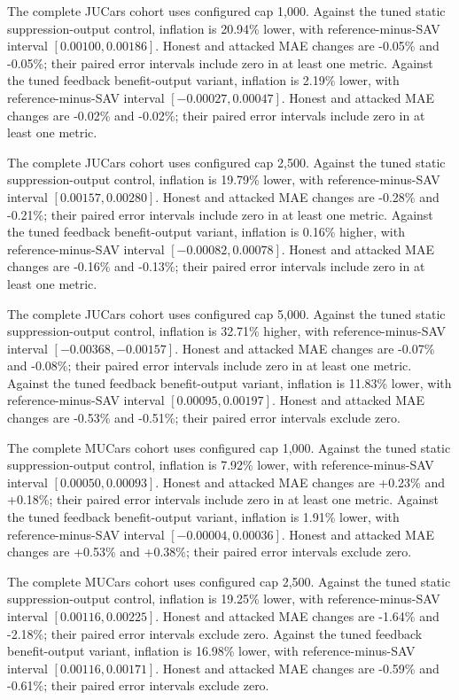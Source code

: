 \documentclass[10pt,journal]{IEEEtran}
\begin{document}
The complete JUCars cohort uses configured cap 1,000. Against the tuned static suppression-output control, inflation is 20.94\% lower, with reference-minus-SAV interval $[0.00100,0.00186]$. Honest and attacked MAE changes are -0.05\% and -0.05\%; their paired error intervals include zero in at least one metric. Against the tuned feedback benefit-output variant, inflation is 2.19\% lower, with reference-minus-SAV interval $[-0.00027,0.00047]$. Honest and attacked MAE changes are -0.02\% and -0.02\%; their paired error intervals include zero in at least one metric.

The complete JUCars cohort uses configured cap 2,500. Against the tuned static suppression-output control, inflation is 19.79\% lower, with reference-minus-SAV interval $[0.00157,0.00280]$. Honest and attacked MAE changes are -0.28\% and -0.21\%; their paired error intervals include zero in at least one metric. Against the tuned feedback benefit-output variant, inflation is 0.16\% higher, with reference-minus-SAV interval $[-0.00082,0.00078]$. Honest and attacked MAE changes are -0.16\% and -0.13\%; their paired error intervals include zero in at least one metric.

The complete JUCars cohort uses configured cap 5,000. Against the tuned static suppression-output control, inflation is 32.71\% higher, with reference-minus-SAV interval $[-0.00368,-0.00157]$. Honest and attacked MAE changes are -0.07\% and -0.08\%; their paired error intervals include zero in at least one metric. Against the tuned feedback benefit-output variant, inflation is 11.83\% lower, with reference-minus-SAV interval $[0.00095,0.00197]$. Honest and attacked MAE changes are -0.53\% and -0.51\%; their paired error intervals exclude zero.

The complete MUCars cohort uses configured cap 1,000. Against the tuned static suppression-output control, inflation is 7.92\% lower, with reference-minus-SAV interval $[0.00050,0.00093]$. Honest and attacked MAE changes are +0.23\% and +0.18\%; their paired error intervals include zero in at least one metric. Against the tuned feedback benefit-output variant, inflation is 1.91\% lower, with reference-minus-SAV interval $[-0.00004,0.00036]$. Honest and attacked MAE changes are +0.53\% and +0.38\%; their paired error intervals exclude zero.

The complete MUCars cohort uses configured cap 2,500. Against the tuned static suppression-output control, inflation is 19.25\% lower, with reference-minus-SAV interval $[0.00116,0.00225]$. Honest and attacked MAE changes are -1.64\% and -2.18\%; their paired error intervals exclude zero. Against the tuned feedback benefit-output variant, inflation is 16.98\% lower, with reference-minus-SAV interval $[0.00116,0.00171]$. Honest and attacked MAE changes are -0.59\% and -0.61\%; their paired error intervals exclude zero.
\end{document}
